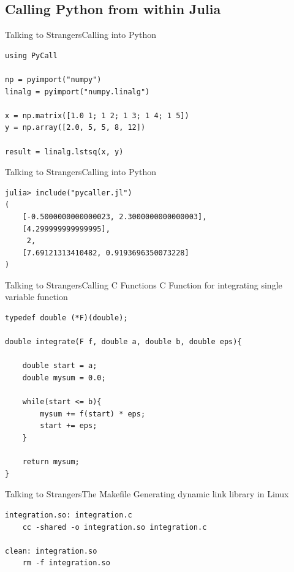 \documentclass[11pt]{beamer}
\begin{document}
\subsection{Calling Python from within Julia}
\begin{frame}[fragile]{Talking to Strangers}{Calling into Python}
\begin{lstlisting}
using PyCall

np = pyimport("numpy")
linalg = pyimport("numpy.linalg")

x = np.matrix([1.0 1; 1 2; 1 3; 1 4; 1 5])
y = np.array([2.0, 5, 5, 8, 12])

result = linalg.lstsq(x, y)
\end{lstlisting}
\end{frame}

\begin{frame}[fragile]{Talking to Strangers}{Calling into Python}
\begin{lstlisting}
julia> include("pycaller.jl")
(
	[-0.5000000000000023, 2.3000000000000003], 
	[4.299999999999995], 
	 2, 
	[7.69121313410482, 0.9193696350073228]
)
\end{lstlisting}
\end{frame}

\begin{frame}[fragile]{Talking to Strangers}{Calling C Functions}
C Function for integrating single variable function
\begin{lstlisting}[basicstyle=\tiny]
typedef double (*F)(double);

double integrate(F f, double a, double b, double eps){
    
    double start = a;
    double mysum = 0.0;

    while(start <= b){
        mysum += f(start) * eps;
        start += eps;
    }
    
    return mysum;
}
\end{lstlisting}
\end{frame}

\begin{frame}[fragile]{Talking to Strangers}{The Makefile}
Generating dynamic link library in Linux
\begin{lstlisting}
integration.so: integration.c
	cc -shared -o integration.so integration.c 

clean: integration.so 
	rm -f integration.so
\end{lstlisting}
\end{frame}
\end{document}
